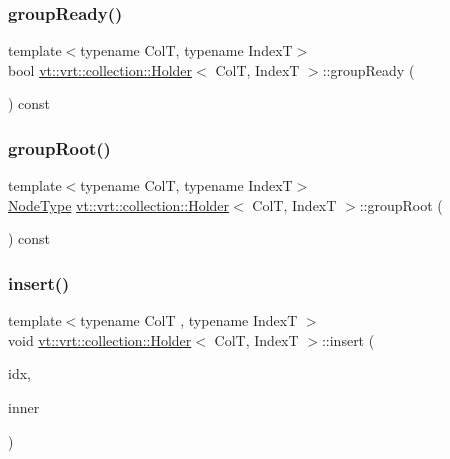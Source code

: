\subsubsection{\texorpdfstring{group\+Ready()}{groupReady()}}
{\footnotesize\ttfamily template$<$typename ColT, typename IndexT$>$ \\
bool \hyperlink{structvt_1_1vrt_1_1collection_1_1_holder}{vt\+::vrt\+::collection\+::\+Holder}$<$ ColT, IndexT $>$\+::group\+Ready (\begin{DoxyParamCaption}{ }\end{DoxyParamCaption}) const\hspace{0.3cm}{\ttfamily [inline]}}

\mbox{\label{structvt_1_1vrt_1_1collection_1_1_holder_a4712da9a79782e5c33de2773d66cc587}} 
\subsubsection{\texorpdfstring{group\+Root()}{groupRoot()}}
{\footnotesize\ttfamily template$<$typename ColT, typename IndexT$>$ \\
\hyperlink{namespacevt_a866da9d0efc19c0a1ce79e9e492f47e2}{Node\+Type} \hyperlink{structvt_1_1vrt_1_1collection_1_1_holder}{vt\+::vrt\+::collection\+::\+Holder}$<$ ColT, IndexT $>$\+::group\+Root (\begin{DoxyParamCaption}{ }\end{DoxyParamCaption}) const\hspace{0.3cm}{\ttfamily [inline]}}

\mbox{\label{structvt_1_1vrt_1_1collection_1_1_holder_a67967ed879eafbbb2e8bb1230bc38874}} 
\subsubsection{\texorpdfstring{insert()}{insert()}}
{\footnotesize\ttfamily template$<$typename ColT , typename IndexT $>$ \\
void \hyperlink{structvt_1_1vrt_1_1collection_1_1_holder}{vt\+::vrt\+::collection\+::\+Holder}$<$ ColT, IndexT $>$\+::insert (\begin{DoxyParamCaption}\item[{IndexT const \&}]{idx,  }\item[{\hyperlink{structvt_1_1vrt_1_1collection_1_1_holder_aafc9b515450179bad7f03e17010b59f8}{Inner\+Holder}$<$ ColT, IndexT $>$ \&\&}]{inner }\end{DoxyParamCaption})}

